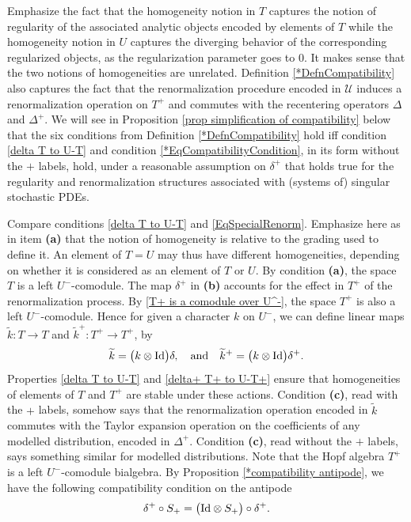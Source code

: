 \documentclass[10pt, reqno]{amsart}
\numberwithin{subsection}{section}
\numberwithin{subsubsection}{subsection}
\numberwithin{equation}{section} %
\theoremstyle{mystyle}
\theoremstyle{mystyle2}
\theoremstyle{mystyle3}
\newcommand{\iden}{\text{\rm Id}}
\begin{document}
Emphasize the fact that the homogeneity notion in $T$ captures the notion of regularity of the associated analytic objects encoded by elements of $T$ while the homogeneity notion in $U$ captures the diverging behavior of the corresponding regularized objects, as the regularization parameter goes to $0$. It makes sense that the two notions of homogeneities are unrelated. Definition \ref{*DefnCompatibility} also captures the fact that the renormalization procedure encoded in $\mathscr{U}$ induces a renormalization operation on $T^+$ and commutes with the recentering operators $\Delta$ and $\Delta^+$. We will see 
in Proposition \ref{prop simplification of compatibility} below that the six conditions from Definition \ref{*DefnCompatibility} hold iff condition \eqref{delta T to U-T} and condition \eqref{*EqCompatibilityCondition}, in its form without the $+$ labels, hold, under a reasonable assumption on $\delta^+$ that holds true for the regularity and renormalization structures associated with (systems of) 
singular stochastic PDEs.

Compare conditions \eqref{delta T to U-T} and \eqref{EqSpecialRenorm}. Emphasize here as in item \textsf{\textbf{(a)}} that the notion of homogeneity is relative to the grading used to define it. An element of $T=U$ may thus have different homogeneities, depending on whether it is considered as an element of $T$ or $U$. By condition \textsf{\textbf{(a)}}, the space $T$ is a left $U^-$-comodule. The map $\delta^+$ in \textsf{\textbf{(b)}} accounts for the effect in $T^+$ of the renormalization process. By \eqref{T+ is a comodule over U^-}, the space $T^+$ is also a left $U^-$-comodule. Hence for given a character $k$ on $U^-$, we can define linear maps $\widetilde k:T\to T$ and $\widetilde k^+:T^+\to T^+$, by
$$
\widetilde k = \big(k\otimes\iden\big)\delta,\quad\textrm{and}\quad 
\widetilde k^+ = \big(k\otimes\iden\big)\delta^+.
$$
Properties \eqref{delta T to U-T} and \eqref{delta+ T+ to U-T+} ensure that homogeneities of elements of $T$ and $T^+$ are stable under these actions. 
Condition \textbf{\textsf{(c)}}, read with the $+$ labels, somehow says that the renormalization operation encoded in $\widetilde{k}$ commutes with the Taylor expansion operation on the coefficients of any modelled distribution, encoded in $\Delta^+$. Condition \textbf{\textsf{(c)}}, read without the $+$ labels, says something similar for modelled distributions. Note that the Hopf algebra $T^+$ is a left $U^-$-comodule bialgebra. By Proposition \ref{*compatibility antipode}, we have the following compatibility condition on the antipode
\begin{align}\label{*EqCompatibilityAntipode}
\delta^+ \circ S_+ = \big(\iden\otimes S_+\big)\circ \delta^+.
\end{align}
\end{document}
